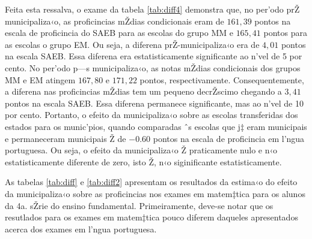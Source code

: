 \documentclass[a4paper, 12pt]{article}
\begin{document}
Feita esta ressalva, o exame da tabela \ref{tab:diff4} demonstra que, no per’odo prŽ municipaliza‹o, as proficincias mŽdias condicionais eram de $161,39$ pontos na escala de proficincia do SAEB para as escolas do grupo MM e $165,41$ pontos para as escolas o grupo EM. Ou seja, a diferena prŽ-municipaliza‹o era de $4,01$ pontos na escala SAEB. Essa diferena era estatisticamente significante ao n’vel de 5 por cento. No per’odo p—s municipaliza‹o, as notas mŽdias condicionais dos grupos MM e EM atingem $167,80$ e $171,22$ pontos, respectivamente. Consequentemente, a diferena nas proficincias mŽdias tem um pequeno decrŽscimo chegando a $3,41$ pontos na escala SAEB. Essa diferena permanece significante, mas ao n’vel de 10 por cento. Portanto, o efeito da municipaliza‹o sobre as escolas transferidas dos estados para os munic’pios, quando comparadas ˆs escolas que j‡ eram municipais e permaneceram municipais Ž de $-0.60$ pontos na escala de proficincia em l’ngua portuguesa. Ou seja, o efeito da municipaliza‹o Ž praticamente nulo e n‹o estatisticamente diferente de zero, isto Ž, n‹o siginificante estatisticamente.



                             

As tabelas \ref{tab:diff} e \ref{tab:diff2} apresentam os resultados da estima‹o do efeito da municipaliza‹o sobre as proficincias nos exames em matem‡tica para os alunos da 4a. sŽrie do ensino fundamental. Primeiramente, deve-se notar que os resutlados para os exames em matem‡tica pouco diferem daqueles apresentados acerca dos exames em l’ngua portuguesa. 
\end{document}
